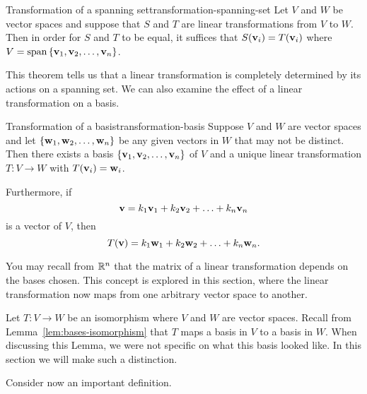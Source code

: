 \begin{theorem}{Transformation of a spanning set}{transformation-spanning-set}
  Let $V$ and $W$ be vector spaces and suppose that $S$ and $T$ are
  linear transformations from $V$ to $W$. Then in order for $S$ and
  $T$ to be equal, it suffices that $S(\mbox{\bf v}_i) = T(\mbox{\bf v}_i)$
  where $V=\sspan \set{\vect{v}_1, \vect{v}_2, \ldots, \vect{v}_n}$.
\end{theorem}

This theorem tells us that a linear transformation is completely
determined by its actions on a spanning set. We can also examine the
effect of a linear transformation on a basis.

\begin{theorem}{Transformation of a basis}{transformation-basis}
  Suppose $V$ and $W$ are vector spaces and let
  $\left\{\mbox{\bf w}_1, \mbox{\bf w}_2, \ldots, \mbox{\bf w}_n\right\}$ be any given
  vectors in $W$ that may not be distinct. Then there exists a basis
  $\left\{\mbox{\bf v}_1, \mbox{\bf v}_2, \ldots, \mbox{\bf v}_n\right\}$ of $V$ and a
  unique linear transformation $T: V \to W$ with
  $T (\mbox{\bf v}_i) = \mbox{\bf w}_i$.

  Furthermore, if
  \begin{equation*}
    \mbox{\bf v} = k_1\mbox{\bf v}_1+k_2\mbox{\bf v}_2+\ldots+ k_n\mbox{\bf v}_n
  \end{equation*}
  is a vector of $V$, then
  \begin{equation*}
    T(\mbox{\bf v}) = k_1\mbox{\bf w}_1+k_2\mbox{\bf w}_2+\ldots+ k_n\mbox{\bf w}_n.
  \end{equation*}
\end{theorem}



You may recall from $\mathbb{R}^n$ that the matrix of a linear transformation
depends on the bases chosen. This concept is explored in this section,
where the linear transformation now maps from one arbitrary vector
space to another.

Let $T: V \to W$ be an isomorphism where $V$ and $W$ are vector
spaces. Recall from Lemma~\ref{lem:bases-isomorphism} that $T$ maps a
basis in $V$ to a basis in $W$. When discussing this Lemma, we were
not specific on what this basis looked like. In this section we will
make such a distinction.

Consider now an important definition.

